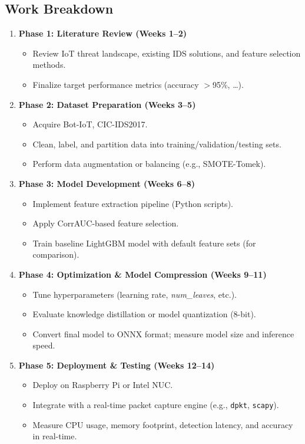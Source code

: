 \documentclass[12pt]{article}
\begin{document}
\subsection{Work Breakdown}
\begin{enumerate}
    \item \textbf{Phase 1: Literature Review (Weeks 1--2)}
    \begin{itemize}
        \item Review IoT threat landscape, existing IDS solutions, and feature selection methods.
        \item Finalize target performance metrics (accuracy $>$95\%, \ldots).
    \end{itemize}
    
    \item \textbf{Phase 2: Dataset Preparation (Weeks 3--5)}
    \begin{itemize}
        \item Acquire Bot-IoT, CIC-IDS2017.
        \item Clean, label, and partition data into training/validation/testing sets.
        \item Perform data augmentation or balancing (e.g., SMOTE-Tomek).
    \end{itemize}
    
    \item \textbf{Phase 3: Model Development (Weeks 6--8)}
    \begin{itemize}
        \item Implement feature extraction pipeline (Python scripts).
        \item Apply CorrAUC-based feature selection.
        \item Train baseline LightGBM model with default feature sets (for comparison).
    \end{itemize}
    
    \item \textbf{Phase 4: Optimization \& Model Compression (Weeks 9--11)}
    \begin{itemize}
        \item Tune hyperparameters (learning rate, \emph{num\_leaves}, etc.).
        \item Evaluate knowledge distillation or model quantization (8-bit).
        \item Convert final model to ONNX format; measure model size and inference speed.
    \end{itemize}
    
    \item \textbf{Phase 5: Deployment \& Testing (Weeks 12--14)}
    \begin{itemize}
        \item Deploy on Raspberry Pi or Intel NUC.
        \item Integrate with a real-time packet capture engine (e.g., \texttt{dpkt}, \texttt{scapy}).
        \item Measure CPU usage, memory footprint, detection latency, and accuracy in real-time.
    \end{itemize}


\end{enumerate}
\end{document}
